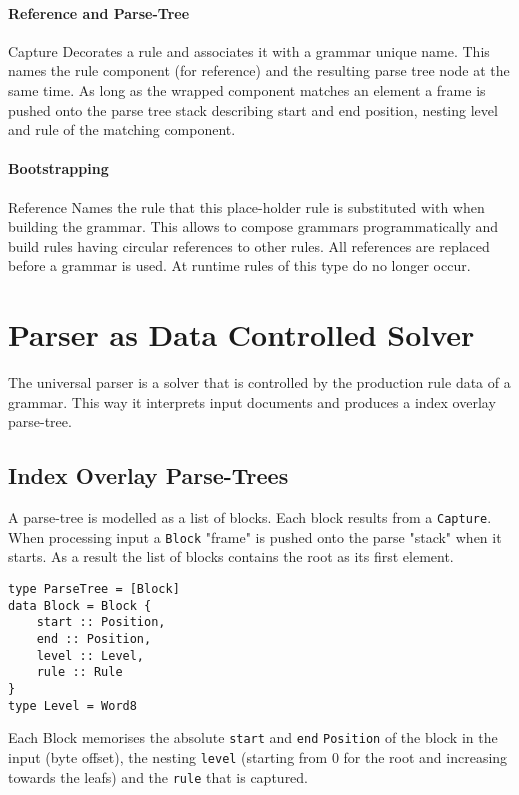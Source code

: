 \documentclass[10pt,a4paper]{article}
\begin{document}
\paragraph{Reference and Parse-Tree}
\begin{rulelist}
\item[Capture] Decorates a rule and associates it with a grammar unique name. This names the rule component (for reference) and the resulting parse tree node at the same time. As long as the wrapped component matches an element a frame is pushed onto the parse tree stack describing start and end position, nesting level and rule of the matching component.
\end{rulelist}

\paragraph{Bootstrapping}
\begin{rulelist}
\item[Reference] Names the rule that this place-holder rule is substituted with when building the grammar. This allows to compose grammars programmatically and build rules having circular references to other rules. All references are replaced before a grammar is used. At runtime rules of this type do no longer occur.
\end{rulelist}

\section{Parser as Data Controlled Solver}
The universal parser is a solver that is controlled by the production rule data of a grammar. This way it interprets input documents and produces a index overlay parse-tree.

\subsection{Index Overlay Parse-Trees}
A parse-tree is modelled as a list of blocks. Each block results from a \texttt{Capture}. When processing input a \texttt{Block} "frame" is pushed onto the parse "stack" when it starts. As a result the list of blocks contains the root as its first element. 
\begin{lstlisting}
type ParseTree = [Block]
data Block = Block { 
	start :: Position,
	end :: Position,
	level :: Level,
	rule :: Rule
}
type Level = Word8
\end{lstlisting}
Each Block memorises the absolute \texttt{start} and \texttt{end} \texttt{Position} of the block in the input (byte offset), the nesting \texttt{level} (starting from 0 for the root and increasing towards the leafs) and the \texttt{rule} that is captured. 
\end{document}
